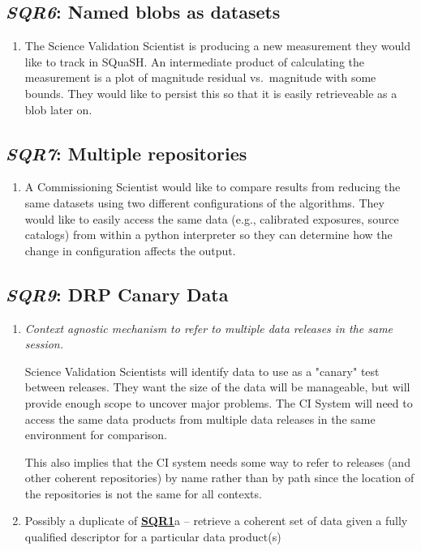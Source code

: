 \documentclass[DM,toc,lsstdraft]{lsstdoc}
\newcommand{\usecase}[3]{%
\subsection{\emph{#1}: #2}
\label{use:#1}
\begin{enumerate}[label=\alph*.]
#3
\end{enumerate}
}
\newcommand{\useref}[1]{\hyperref[use:#1]{\textcolor{lsstblue}{\textbf{#1}}}}
\begin{document}
\usecase{SQR6}{Named blobs as datasets}{%

\item
The Science Validation Scientist is producing a new measurement they would like to track in SQuaSH.
An intermediate product of calculating the measurement is a plot of magnitude residual vs.\ magnitude with some bounds.
They would like to persist this so that it is easily retrieveable as a blob later on.

}

\usecase{SQR7}{Multiple repositories}{%

\item
A Commissioning Scientist would like to compare results from reducing the same datasets using two different configurations of the algorithms.
They would like to easily access the same data (e.g., calibrated exposures, source catalogs) from within a python interpreter so they can determine how the change in configuration affects the output.

}

\usecase{SQR9}{DRP Canary Data}{%

\item
\emph{Context agnostic mechanism to refer to multiple data releases in the same session.}

Science Validation Scientists will identify data to use as a "canary" test between releases. They want the size of the data will be manageable, but will provide enough scope to uncover major problems.
The CI System will need to access the same data products from multiple data releases in the same environment for comparison.

This also implies that the CI system needs some way to refer to releases (and other coherent repositories) by name rather than by path since the location of the repositories is not the same for all contexts.

\item
Possibly a duplicate of \useref{SQR1}a -- retrieve a coherent set of data given a fully qualified descriptor for a particular data product(s)

}
\end{document}
